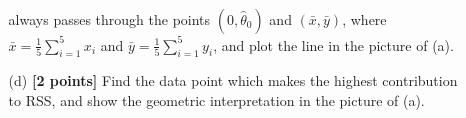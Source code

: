 \documentclass[10pt]{article}
\begin{document}
\begin{enumerate}
\begin{itemize}
\begin{equation}
		            \end{equation}
		            always passes through the points $(0,\hat{\theta}_0)$ and $(\bar{x},\bar{y})$,
		            where $\bar{x} = \tfrac{1}{5}\sum_{i=1}^{5}x_{i}$ and $\bar{y} = \tfrac{1}{5}\sum_{i=1}^{5} y_{i}$, and plot the line in the picture of (a).
		      \item[(d)] \textbf{[2 points]} Find the data point which makes the highest contribution to RSS, and show the geometric interpretation in the picture of (a).

	      \end{itemize}

\end{enumerate}
\end{document}

